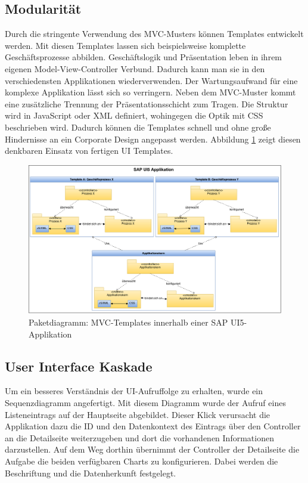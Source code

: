 \newpage
\subsection{Modularität}
Durch die stringente Verwendung des MVC-Musters können Templates entwickelt werden. Mit diesen Templates lassen sich beispielsweise komplette Geschäftsprozesse abbilden. Geschäftslogik und Präsentation leben in ihrem eigenen Model-View-Controller Verbund. Dadurch kann man sie in den verschiedensten Applikationen wiederverwenden. Der Wartungsaufwand für eine komplexe Applikation lässt sich so verringern. Neben dem MVC-Muster kommt eine zusätzliche Trennung der Präsentationsschicht zum Tragen. Die Struktur wird in JavaScript oder XML definiert, wohingegen die Optik mit CSS beschrieben wird. Dadurch können die Templates schnell und ohne große Hindernisse an ein Corporate Design angepasst werden. Abbildung \ref{fig:sapui5mvctemplates} zeigt diesen denkbaren Einsatz von fertigen UI Templates.

\vspace{1em}
\begin{figure}[htb]
  \centering
  \includegraphics[width=1\linewidth,angle=90]{abb/sapui5_mvc_templates}
  \caption[Paketdiagramm: MVC-Templates innerhalb einer SAP UI5-Applikation]{Paketdiagramm: MVC-Templates innerhalb einer SAP UI5-Applikation}
  \label{fig:sapui5mvctemplates}
\end{figure}

\newpage
\subsection{User Interface Kaskade}
Um ein besseres Verständnis der UI-Aufruffolge zu erhalten, wurde ein Sequenzdiagramm angefertigt. Mit diesem Diagramm wurde der Aufruf eines Listeneintrags auf der Hauptseite abgebildet. Dieser Klick verursacht die Applikation dazu die ID und den Datenkontext des Eintrags über den Controller an die Detailseite weiterzugeben und dort die vorhandenen Informationen darzustellen. Auf dem Weg dorthin übernimmt der Controller der Detailseite die Aufgabe die beiden verfügbaren Charts zu konfigurieren. Dabei werden die Beschriftung und die Datenherkunft festgelegt.

